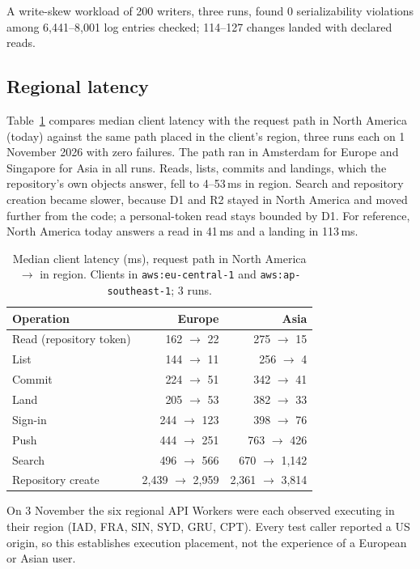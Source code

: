 \documentclass[11pt]{article}
\newcommand{\code}[1]{\texttt{#1}}
\begin{document}
A write-skew workload of 200 writers, three runs, found 0 serializability violations
among 6,441--8,001 log entries checked; 114--127 changes landed with declared reads.

\subsection{Regional latency}

Table~\ref{tab:region} compares median client latency with the request path in North
America (today) against the same path placed in the client's region, three runs each on
1 November 2026 with zero failures. The path ran in Amsterdam for Europe and Singapore
for Asia in all runs. Reads, lists, commits and landings, which the repository's own
objects answer, fell to 4--53\,ms in region. Search and repository creation became slower, because D1 and R2 stayed in
North America and moved further from the code; a personal-token read stays bounded by
D1. For reference, North America today answers a read in 41\,ms and a landing in
113\,ms.

\begin{table}[t]
\centering
\small
\begin{tabular}{@{}lrr@{}}
\toprule
Operation & Europe & Asia \\
\midrule
Read (repository token) & 162 $\to$ 22 & 275 $\to$ 15 \\
List & 144 $\to$ 11 & 256 $\to$ 4 \\
Commit & 224 $\to$ 51 & 342 $\to$ 41 \\
Land & 205 $\to$ 53 & 382 $\to$ 33 \\
Sign-in & 244 $\to$ 123 & 398 $\to$ 76 \\
Push & 444 $\to$ 251 & 763 $\to$ 426 \\
Search & 496 $\to$ 566 & 670 $\to$ 1,142 \\
Repository create & 2,439 $\to$ 2,959 & 2,361 $\to$ 3,814 \\
\bottomrule
\end{tabular}
\caption{Median client latency (ms), request path in North America $\to$ in region.
Clients in \code{aws:eu-central-1} and \code{aws:ap-southeast-1}; 3 runs.}
\label{tab:region}
\end{table}

On 3 November the six regional API Workers were each observed executing in their
region (IAD, FRA, SIN, SYD, GRU, CPT). Every test caller reported a US origin, so this
establishes execution placement, not the experience of a European or Asian user.
\end{document}

